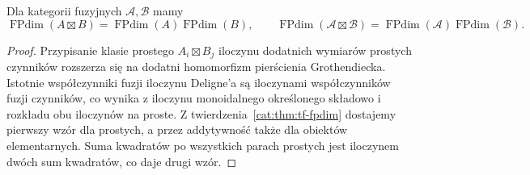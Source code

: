 \begin{stwierdzenie}\label{cat:prop:tf-deligne-fpdim}
Dla kategorii fuzyjnych $\mathcal A,\mathcal B$ mamy
\[
 \operatorname{FPdim}(A\boxtimes B)
 =\operatorname{FPdim}(A)\operatorname{FPdim}(B),
 \qquad
 \operatorname{FPdim}(\mathcal A\boxtimes\mathcal B)
 =\operatorname{FPdim}(\mathcal A)\operatorname{FPdim}(\mathcal B).
\]
\end{stwierdzenie}
\begin{proof}
Przypisanie klasie prostego $A_i\boxtimes B_j$ iloczynu dodatnich wymiarów prostych czynników rozszerza się na dodatni homomorfizm pierścienia Grothendiecka. Istotnie współczynniki fuzji iloczynu Deligne'a są iloczynami współczynników fuzji czynników, co wynika z iloczynu monoidalnego określonego składowo i rozkładu obu iloczynów na proste. Z twierdzenia~\ref{cat:thm:tf-fpdim} dostajemy pierwszy wzór dla prostych, a przez addytywność także dla obiektów elementarnych. Suma kwadratów po wszystkich parach prostych jest iloczynem dwóch sum kwadratów, co daje drugi wzór.
\end{proof}

